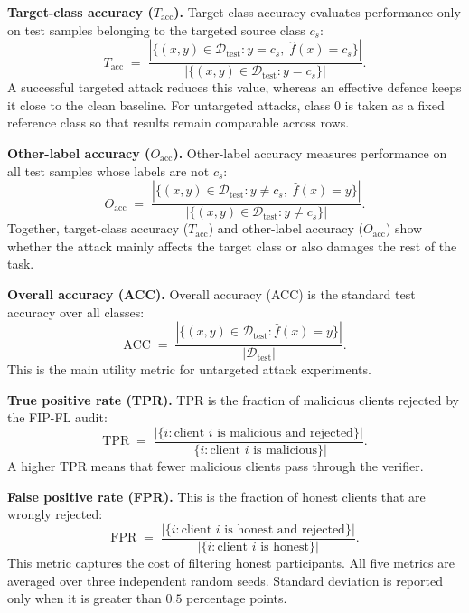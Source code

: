 \noindent\textbf{Target-class accuracy ($T_{\text{acc}}$).} Target-class accuracy evaluates performance only on test samples belonging to the targeted source class $c_s$:
\begin{equation}
    T_{\text{acc}} \;=\; \frac{|\{(x, y) \in \mathcal{D}_{\text{test}} : y = c_{s},\; \hat{f}(x) = c_{s}\}|}{|\{(x, y) \in \mathcal{D}_{\text{test}} : y = c_{s}\}|}.
\end{equation}
A successful targeted attack reduces this value, whereas an effective defence keeps it close to the clean baseline. For untargeted attacks, class $0$ is taken as a fixed reference class so that results remain comparable across rows.

\noindent\textbf{Other-label accuracy ($O_{\text{acc}}$).} Other-label accuracy measures performance on all test samples whose labels are not $c_s$:
\begin{equation}
    O_{\text{acc}} \;=\; \frac{|\{(x, y) \in \mathcal{D}_{\text{test}} : y \neq c_{s},\; \hat{f}(x) = y\}|}{|\{(x, y) \in \mathcal{D}_{\text{test}} : y \neq c_{s}\}|}.
\end{equation}
Together, target-class accuracy ($T_{\text{acc}}$) and other-label accuracy ($O_{\text{acc}}$) show whether the attack mainly affects the target class or also damages the rest of the task.

\noindent\textbf{Overall accuracy (ACC).} Overall accuracy (ACC) is the standard test accuracy over all classes:
\begin{equation}
    \mathrm{ACC} \;=\; \frac{|\{(x, y) \in \mathcal{D}_{\text{test}} : \hat{f}(x) = y\}|}{|\mathcal{D}_{\text{test}}|}.
\end{equation}
This is the main utility metric for untargeted attack experiments.

\noindent\textbf{True positive rate (TPR).} TPR is the fraction of malicious clients rejected by the FIP-FL audit:
\begin{equation}
    \mathrm{TPR} \;=\; \frac{|\{i : \text{client } i \text{ is malicious and rejected}\}|}{|\{i : \text{client } i \text{ is malicious}\}|}.
\end{equation}
A higher TPR means that fewer malicious clients pass through the verifier.

\noindent\textbf{False positive rate (FPR).} This is the fraction of honest clients that are wrongly rejected:
\begin{equation}
    \mathrm{FPR} \;=\; \frac{|\{i : \text{client } i \text{ is honest and rejected}\}|}{|\{i : \text{client } i \text{ is honest}\}|}.
\end{equation}
This metric captures the cost of filtering honest participants. All five metrics are averaged over three independent random seeds. Standard deviation is reported only when it is greater than $0.5$ percentage points.

